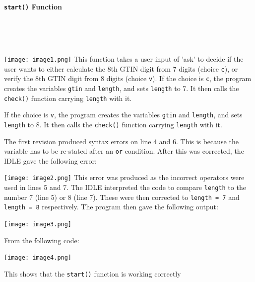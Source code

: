 \documentclass[a4paper]{article}
\begin{document}
\paragraph{\texttt{start()} Function} ~ \par ~ \par
\noindent\texttt{[image: image1.png]}
This function takes a user input of 'ask' to decide if the user wants to either calculate the 8th GTIN digit from 7 digits (choice \verb|c|), or verify the 8th GTIN digit from 8 digits (choice \verb|v|). 
If the choice is \verb|c|, the program creates the variables \verb|gtin| and \verb|length|, and sets \verb|length| to 7. It then calls the \verb|check()| function carrying \verb|length| with it. \par
If the choice is \verb|v|, the program creates the variables \verb|gtin| and \verb|length|, and sets \verb|length| to 8. It then calls the \verb|check()| function carrying \verb|length| with it. \par
The first revision produced syntax errors on line 4 and 6. This is because the variable has to be re-stated after an \verb|or| condition. After this was corrected, the IDLE gave the following error: \par
\noindent\texttt{[image: image2.png]}
This error was produced as the incorrect operators were used in lines 5 and 7. The IDLE interpreted the code to compare \verb|length| to the number 7 (line 5) or 8 (line 7). These were then corrected to \verb|length = 7| and \verb|length = 8| respectively. The program then gave the following output: \par
\noindent\texttt{[image: image3.png]} \par
From the following code: \par
\noindent\texttt{[image: image4.png]} \par 
This shows that the \verb|start()| function is working correctly
\newpage
\end{document}

